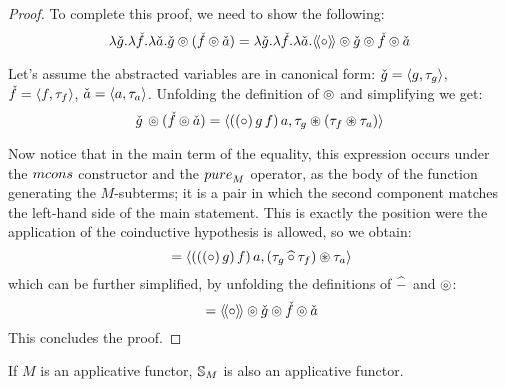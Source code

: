 \begin{proof}
To complete this proof, we need to show the following:
$$
\lambda \check{g}. \lambda \check{f}. \lambda \check{a}. \check{g} \circledcirc (\check{f}\circledcirc \check{a})
  = 
\lambda \check{g}. \lambda \check{f}. \lambda \check{a}. \mathopen{\langle\!\langle}{\circ}\mathclose{\rangle\!\rangle} \circledcirc \check{g}  \circledcirc \check{f}  \circledcirc \check{a}
$$

Let's assume the abstracted variables are in canonical form: $\check{g} = \langle g, \tau_g \rangle$, $\check{f} = \langle f, \tau_f \rangle$, $\check{a} = \langle a, \tau_a \rangle$.
Unfolding the definition of $\circledcirc$ and simplifying we get:
$$
\check{g}\, \circledcirc (\check{f} \circledcirc \check{a})
 = \langle ((\circ)\, g\, f)\, a, \tau_g \circledast (\tau_f \circledast \tau_a) \rangle
$$

Now notice that in the main term of the equality, this expression occurs under the $\mcons$ constructor and the $\apure_M$ operator, as the body of the function generating the $M$-subterms; it is a pair in which the second component matches the left-hand side of the main statement.
This is exactly the position were the application of the coinductive hypothesis is allowed, so we obtain:
$$
{} = \langle (((\circ)\, g)\, f)\, a, (\tau_g \mathbin{\widehat{\circ}} \tau_f) \circledast \tau_a \rangle
$$
which can be further simplified, by unfolding the definitions of $\mathbin{\widehat{-}}$ and $\circledcirc$:
$$
{} = \mathopen{\langle\!\langle}{\circ}\mathclose{\rangle\!\rangle} \circledcirc \check{g} \circledcirc \check{f} \circledcirc \check{a}
$$
This concludes the proof.
\end{proof}


\begin{theorem}\label{lemma:appl_laws}
If $M$ is an applicative functor, $\mathbb{S}_{M}$ is also an applicative functor.
\end{theorem}
